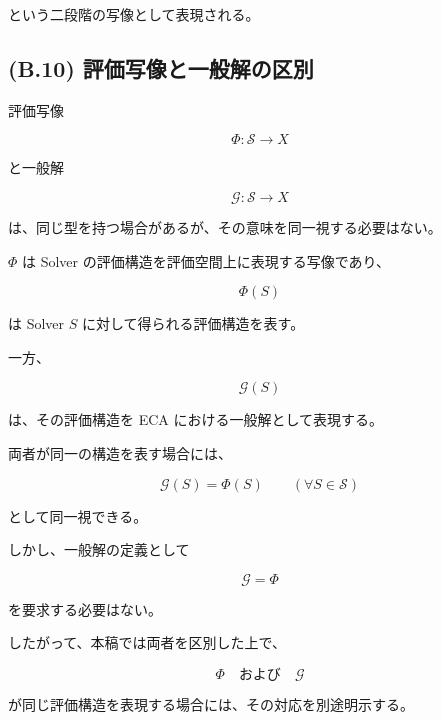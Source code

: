 \documentclass[a4paper,11pt]{article}
\newcommand{\Solver}{\mathcal{S}}
\begin{document}
という二段階の写像として表現される。


\subsection{(B.10) 評価写像と一般解の区別}
\label{subsec:B10}

評価写像

\begin{equation}
    \Phi:\Solver\to X
\end{equation}

と一般解

\begin{equation}
    \mathcal{G}:\Solver\to X
\end{equation}

は、同じ型を持つ場合があるが、その意味を同一視する必要はない。

$\Phi$ は Solver の評価構造を評価空間上に表現する写像であり、

\begin{equation}
    \Phi(S)
\end{equation}

は Solver $S$ に対して得られる評価構造を表す。

一方、

\begin{equation}
    \mathcal{G}(S)
\end{equation}

は、その評価構造を ECA における一般解として表現する。

両者が同一の構造を表す場合には、

\begin{equation}
    \mathcal{G}(S)
    =
    \Phi(S)
    \qquad
    (\forall S\in\Solver)
\end{equation}

として同一視できる。

しかし、一般解の定義として

\begin{equation}
    \mathcal{G}=\Phi
\end{equation}

を要求する必要はない。

したがって、本稿では両者を区別した上で、

\begin{equation}
    \Phi
    \quad\text{および}\quad
    \mathcal{G}
\end{equation}

が同じ評価構造を表現する場合には、その対応を別途明示する。
\end{document}
